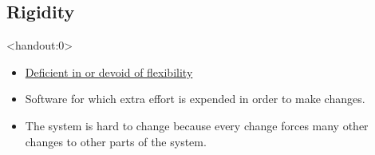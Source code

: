 \documentclass[xcolor=svgnames]{beamer}
\begin{document}


\subsection{Rigidity}


{%
%
\begin{frame}<handout:0>{\subsecname}
\end{frame}
}

{%
%
\begin{frame}{\subsecname}

    \begin{itemize}
        \item \href{https://www.merriam-webster.com/dictionary/rigid}
            {Deficient in or devoid of flexibility} \pause
        \item Software for which extra effort is expended in order to make
            changes. \pause
        \item The system is hard to change because every change forces many
            other changes to other parts of the system.
    \end{itemize}
\end{frame}
}


\end{document}
